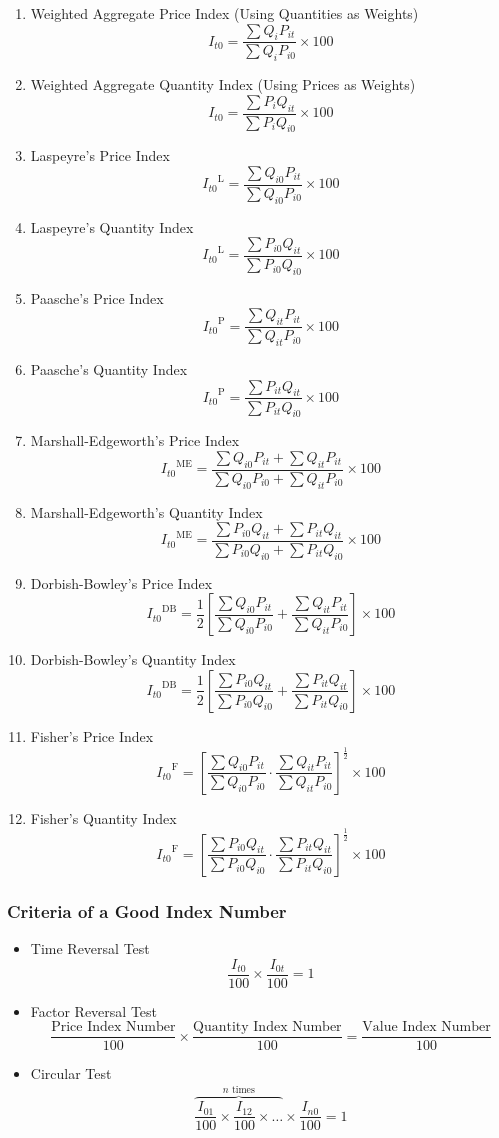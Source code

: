 \documentclass[
10pt, %
a4paper, %
]{report}
\begin{document}
\begin{itemize}
\begin{enumerate}
\item Weighted Aggregate Price Index (Using Quantities as Weights) \[I_{t0} = \frac{\sum Q_i P_{it}}{\sum Q_i P_{i0}} \times 100\]
\item Weighted Aggregate Quantity Index (Using Prices as Weights) \[I_{t0} = \frac{\sum P_i Q_{it}}{\sum P_i Q_{i0}} \times 100\]
\item Laspeyre's Price Index \[{I_{t0}}^\mathrm{L} = \frac{\sum Q_{i0} P_{it}}{\sum Q_{i0} P_{i0}} \times 100\]
\item Laspeyre's Quantity Index \[{I_{t0}}^\mathrm{L} = \frac{\sum P_{i0} Q_{it}}{\sum P_{i0} Q_{i0}} \times 100\]
\item Paasche's Price Index \[{I_{t0}}^\mathrm{P} = \frac{\sum Q_{it} P_{it}}{\sum Q_{it} P_{i0}} \times 100\]
\item Paasche's Quantity Index \[{I_{t0}}^\mathrm{P} = \frac{\sum P_{it} Q_{it}}{\sum P_{it} Q_{i0}} \times 100\]
\item Marshall-Edgeworth's Price Index \[{I_{t0}}^\mathrm{ME} = \frac{\sum Q_{i0} P_{it} + \sum Q_{it} P_{it}}{\sum Q_{i0} P_{i0} + \sum Q_{it} P_{i0}} \times 100\]
\item Marshall-Edgeworth's Quantity Index \[{I_{t0}}^\mathrm{ME} = \frac{\sum P_{i0} Q_{it} + \sum P_{it} Q_{it}}{\sum P_{i0} Q_{i0} + \sum P_{it} Q_{i0}} \times 100\]
\item Dorbish-Bowley's Price Index \[{I_{t0}}^\mathrm{DB} = \frac{1}{2} \left[ \frac{\sum Q_{i0} P_{it}}{\sum Q_{i0} P_{i0}} + \frac{\sum Q_{it} P_{it}}{\sum Q_{it} P_{i0}} \right] \times 100\]
\item Dorbish-Bowley's Quantity Index \[{I_{t0}}^\mathrm{DB} = \frac{1}{2} \left[ \frac{\sum P_{i0} Q_{it}}{\sum P_{i0} Q_{i0}} + \frac{\sum P_{it} Q_{it}}{\sum P_{it} Q_{i0}} \right] \times 100\]\item Fisher's Price Index \[{I_{t0}}^\mathrm{F} = \left[ \frac{\sum Q_{i0} P_{it}}{\sum Q_{i0} P_{i0}} \cdot \frac{\sum Q_{it} P_{it}}{\sum Q_{it} P_{i0}} \right]^\frac{1}{2} \times 100\]
\item Fisher's Quantity Index \[{I_{t0}}^\mathrm{F} = \left[ \frac{\sum P_{i0} Q_{it}}{\sum P_{i0} Q_{i0}} \cdot \frac{\sum P_{it} Q_{it}}{\sum P_{it} Q_{i0}} \right]^\frac{1}{2} \times 100\]
\end{enumerate}
\end{itemize}

\subsubsection{Criteria of a Good Index Number}
\begin{itemize}
\item Time Reversal Test
\[\frac{I_{t0}}{100} \times \frac{I_{0t}}{100} = 1\]
\item Factor Reversal Test
\[\frac{\text{Price Index Number}}{100} \times \frac{\text{Quantity Index Number}}{100} = \frac{\text{Value Index Number}}{100}\]
\item Circular Test
\[ \overbrace{\frac{I_{01}}{100} \times \frac{I_{12}}{100} \times\dots}^{n \text{ times}} \times \frac{I_{n0}}{100}= 1\]
\end{itemize}
\end{document}

